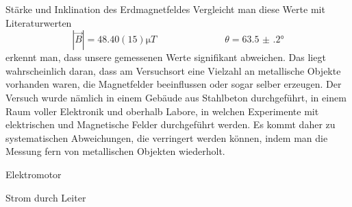 \documentclass{alex_gp}
\begin{document}
\begin{mybox}{Stärke und Inklination des Erdmagnetfeldes}
	Vergleicht man diese Werte mit Literaturwerten \footnotemark[1]
	\begin{equation}\label{key}
		|\vec{B}| = 48.40(15) \unit{\micro T} \hspace{3cm} \theta = \ang{63.5(2)}
	\end{equation}
	erkennt man, dass unsere gemessenen Werte signifikant abweichen. Das liegt wahrscheinlich daran, dass am Versuchsort eine Vielzahl an metallische Objekte vorhanden waren, die Magnetfelder beeinflussen oder sogar selber erzeugen. Der Versuch wurde nämlich in einem Gebäude aus Stahlbeton durchgeführt, in einem Raum voller Elektronik und oberhalb Labore, in welchen Experimente mit elektrischen und Magnetische Felder durchgeführt werden. Es kommt daher zu systematischen Abweichungen, die verringert werden können, indem man die Messung fern von metallischen Objekten wiederholt.

\end{mybox}

\begin{mybox}{Elektromotor}
	
\end{mybox}

\begin{mybox}{Strom durch Leiter}

\end{mybox}
\end{document}
